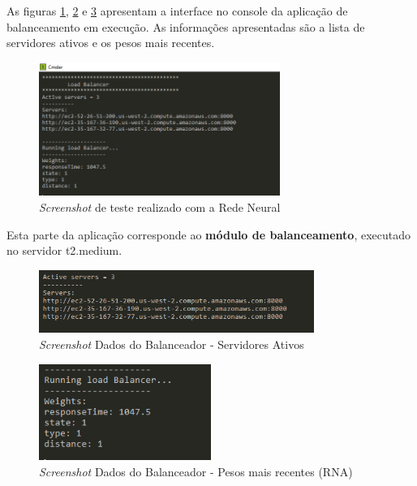 As figuras \ref{fig:consoleann}, \ref{fig:areas} e \ref{fig:weights} apresentam a interface no console da aplicação de balanceamento em execução. As informações apresentadas são a lista de servidores ativos e os pesos mais recentes. 

\begin{figure}[htb]
	\caption{\label{fig:consoleann} \textit{Screenshot} de teste realizado com a Rede Neural}
	\begin{center}
		\includegraphics[width=0.70\textwidth]{img/load-bal-app.png}
	\end{center}
\end{figure}

Esta parte da aplicação corresponde ao \textbf{módulo de balanceamento}, executado no servidor t2.medium. 

\begin{figure}[htb]
	\caption{\label{fig:areas} \textit{Screenshot} Dados do Balanceador - Servidores Ativos}
	\begin{center}
		\includegraphics[width=0.80\textwidth]{img/activeservers.png}
	\end{center}
\end{figure}

\begin{figure}[htb]
	\caption{\label{fig:weights} \textit{Screenshot} Dados do Balanceador - Pesos mais recentes (RNA)}
	\begin{center}
		\includegraphics[width=0.50\textwidth]{img/weights.png}
	\end{center}
\end{figure}





